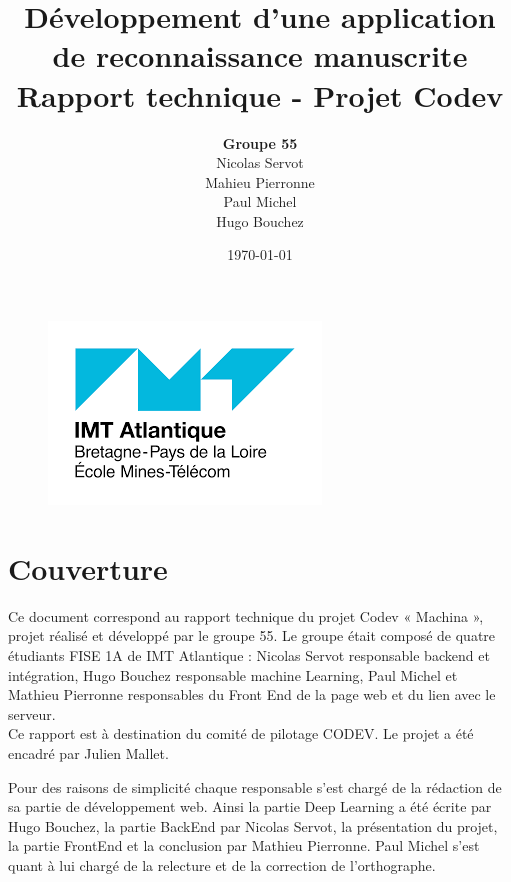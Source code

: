 \documentclass[oneside,a4paper,13pt]{article}
\begin{document}
\title{ \textbf{Développement d'une application de reconnaissance manuscrite}\\ Rapport technique - Projet Codev}
\author{\textbf {Groupe 55} \\ Nicolas Servot\\Mahieu Pierronne\\Paul Michel\\Hugo Bouchez}
\date{\today}

\maketitle
\begin{figure}[H]
    \centering
    \includegraphics[scale=0.7]{Images/Logo_IMT.png}
    \label{fig:neural_network}
\end{figure}

\newpage

\section*{Couverture}
Ce document correspond au rapport technique du projet Codev « Machina », projet réalisé et développé par le groupe 55. Le groupe était composé de quatre étudiants FISE 1A de IMT Atlantique : Nicolas Servot responsable backend et intégration, Hugo Bouchez responsable machine Learning, Paul Michel et Mathieu Pierronne responsables du Front End de la page web et du lien avec le serveur.\\
Ce rapport est à destination du comité de pilotage CODEV. Le projet a été encadré par Julien Mallet.  

\medbreak
Pour des raisons de simplicité chaque responsable s’est chargé de la rédaction de sa partie de développement web. Ainsi la partie Deep Learning a été écrite par Hugo Bouchez, la partie BackEnd par Nicolas Servot, la présentation du projet, la partie FrontEnd et la conclusion par Mathieu Pierronne. Paul Michel s’est quant à lui chargé de la relecture et de la correction de l’orthographe. 
\bigskip
\end{document}
